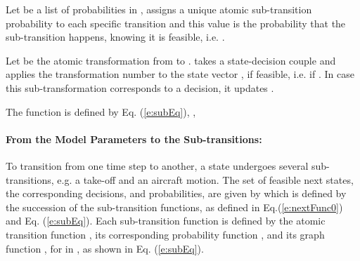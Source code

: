 \documentclass[letterpaper]{article}
\begin{document}
Let  be a list of probabilities in ,  assigns a unique atomic sub-transition probability to each specific transition  and
 this value is the probability that the sub-transition happens, knowing it is feasible, i.e. .

Let  be the atomic transformation  from  to .  takes a state-decision couple  
and applies the transformation number  to the state vector , if feasible, i.e. if . 
In case this sub-transformation corresponds to a decision, it updates .

The function  is defined by Eq. (\ref{e:subEq}), ,



\paragraph{From the Model Parameters to the Sub-transitions:}

To transition from one
time step to another, a state  undergoes several sub-transitions, e.g. a take-off and an aircraft motion.
The set of feasible next states, the corresponding decisions, and probabilities, are given by  which is
defined by the succession of the  sub-transition functions, as defined in Eq.(\ref{e:nextFunc0}) and Eq. (\ref{e:subEq}).
Each sub-transition function  is defined by the  atomic transition function , 
its corresponding probability function , and its graph function , for  in , as shown in Eq. (\ref{e:subEq}).
\end{document}
